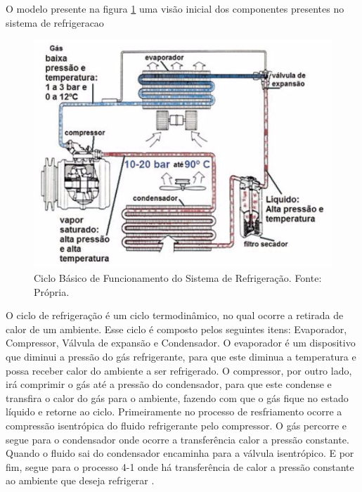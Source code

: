             O modelo presente na figura \ref{ciclo-sistema-refrigeracao} uma visão inicial dos componentes presentes no sistema de
            refrigeracao

            \begin{figure}[!htb]
                \centering
                \includegraphics[scale= 0.7]{figuras/ciclo-refrigeracao.png}
                \caption{Ciclo Básico de Funcionamento do Sistema de Refrigeração. Fonte: Própria.}
                \label{ciclo-sistema-refrigeracao}
            \end{figure}

            O ciclo de refrigeração é um ciclo termodinâmico, no qual ocorre a retirada de calor de
            um ambiente. Esse ciclo é composto pelos seguintes itens: Evaporador, Compressor, Válvula
            de expansão e Condensador. O evaporador é um dispositivo que diminui a pressão do gás
            refrigerante, para que este diminua a temperatura e possa receber calor do ambiente a ser
            refrigerado. O compressor, por outro lado, irá comprimir o gás até a pressão do condensador,
            para que este condense e transfira o calor do gás para o ambiente, fazendo com que o gás
            fique no estado líquido e retorne ao ciclo. Primeiramente no processo de resfriamento ocorre a
            compressão isentrópica do fluido refrigerante pelo compressor. O gás percorre e segue para o
            condensador onde ocorre a transferência calor a pressão constante. Quando o fluido sai do
            condensador encaminha para a válvula isentrópico. E por fim, segue para o processo 4-1 onde
            há transferência de calor a pressão constante ao ambiente que deseja refrigerar \cite{boles}.

